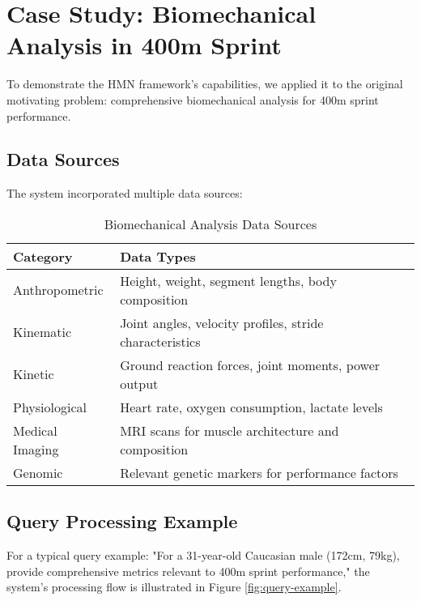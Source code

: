 \documentclass[journal,onecolumn]{IEEEtran}
\begin{document}
\section{Case Study: Biomechanical Analysis in 400m Sprint}

To demonstrate the HMN framework's capabilities, we applied it to the original motivating problem: comprehensive biomechanical analysis for 400m sprint performance.

\subsection{Data Sources}

The system incorporated multiple data sources:

\begin{table}[ht]
\centering
\caption{Biomechanical Analysis Data Sources}
\label{tab:data-sources}
\begin{tabular}{lp{8cm}}
\toprule
\textbf{Category} & \textbf{Data Types} \\
\midrule
Anthropometric & Height, weight, segment lengths, body composition \\
Kinematic & Joint angles, velocity profiles, stride characteristics \\
Kinetic & Ground reaction forces, joint moments, power output \\
Physiological & Heart rate, oxygen consumption, lactate levels \\
Medical Imaging & MRI scans for muscle architecture and composition \\
Genomic & Relevant genetic markers for performance factors \\
\bottomrule
\end{tabular}
\end{table}

\subsection{Query Processing Example}

For a typical query example: "For a 31-year-old Caucasian male (172cm, 79kg), provide comprehensive metrics relevant to 400m sprint performance," the system's processing flow is illustrated in Figure \ref{fig:query-example}.
\end{document}
